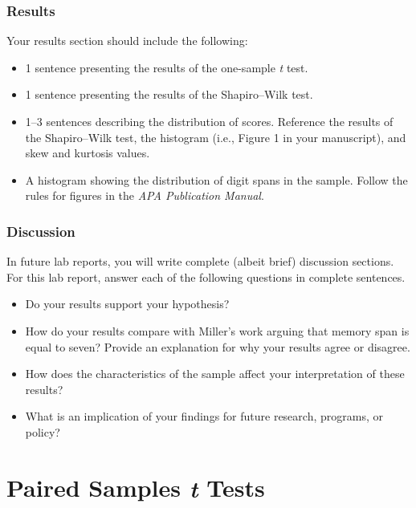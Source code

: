 \documentclass[
]{book}
\providecommand{\tightlist}{%
  \setlength{\itemsep}{0pt}\setlength{\parskip}{0pt}}
\begin{document}
\hypertarget{results}{%
\subsection{Results}\label{results}}

Your results section should include the following:

\begin{itemize}
\tightlist
\item
  1 sentence presenting the results of the one-sample \emph{t} test.
\item
  1 sentence presenting the results of the Shapiro--Wilk test.
\item
  1--3 sentences describing the distribution of scores. Reference the results of the Shapiro--Wilk test, the histogram (i.e., Figure 1 in your manuscript), and skew and kurtosis values.
\item
  A histogram showing the distribution of digit spans in the sample. Follow the rules for figures in the \emph{APA Publication Manual}.
\end{itemize}

\hypertarget{discussion}{%
\subsection{Discussion}\label{discussion}}

In future lab reports, you will write complete (albeit brief) discussion sections. For this lab report, answer each of the following questions in complete sentences.

\begin{itemize}
\tightlist
\item
  Do your results support your hypothesis?
\item
  How do your results compare with Miller's work arguing that memory span is equal to seven? Provide an explanation for why your results agree or disagree.
\item
  How does the characteristics of the sample affect your interpretation of these results?
\item
  What is an implication of your findings for future research, programs, or policy?
\end{itemize}

\hypertarget{pst}{%
\chapter{\texorpdfstring{Paired Samples \emph{t} Tests}{Paired Samples t Tests}}\label{pst}}
\end{document}
